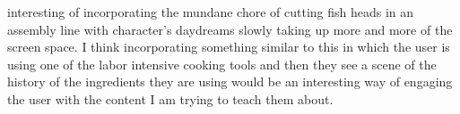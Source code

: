 \documentclass[11pt,twocolumn]{article}
\begin{document}
interesting of incorporating the mundane chore of cutting fish heads in an assembly line with character’s daydreams slowly taking up more and more of the screen space. I think incorporating something similar to this in which the user is using one of the labor intensive cooking tools and then they see a scene of the history of the ingredients they are using would be an interesting way of engaging the user with the content I am trying to teach them about. 

\printbibliography 
\end{document}
